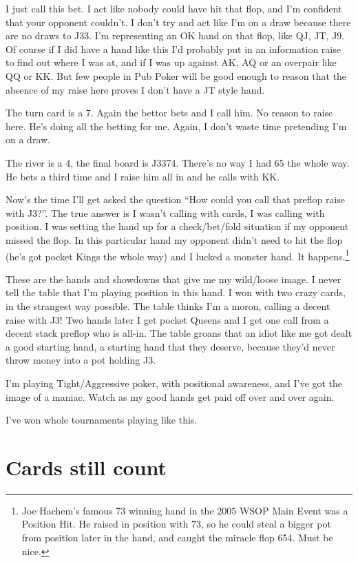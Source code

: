 I just call this bet. I act like nobody could have hit that flop, and
I'm confident that your opponent couldn't. I don't try and act like
I'm on a draw because there are no draws to J33. I'm representing an
OK hand on that flop, like QJ, JT, J9. Of course if I did have a hand
like this I'd probably put in an information raise to find out where
I was at, and if I was up against AK, AQ or an overpair like QQ or KK.
But few people in Pub Poker will be good enough to reason that the
absence of my raise here proves I don't have a JT style hand.

The turn card is a 7. Again the bettor bets and I call him.
No reason to raise here. He's doing all the betting for me. Again,
I don't waste time pretending I'm on a draw.

The river is a 4, the final board is J3374. There's no way I had 65
the whole way. He bets a third time and I raise him all in and he
calls with KK.

Now's the time I'll get asked the question ``How could you call that
preflop raise with J3?''. The true answer is I wasn't calling with
cards, I was calling with position. I was setting the hand up for
a check/bet/fold situation if my opponent missed the flop. In this
particular hand my opponent didn't need to hit the flop (he's got pocket
Kings the whole way) and I lucked a monster hand.
It happens.\footnote{Joe Hachem's famous 73 winning hand in the 2005
WSOP Main Event was a Position Hit. He raised in position with 73, so
he could steal a bigger pot from position later in the hand, and caught
the miracle flop 654. Must be nice.}

These are the hands and showdowns that give me my wild/loose image.
I never tell the table that I'm playing position in this hand.
I won with two crazy cards, in the strangest way possible. The table
thinks I'm a moron, calling a decent raise with J3! Two hands later I get
pocket Queens and I get one call from a decent stack preflop who is all-in.
The table groans that an idiot like me got dealt a good
starting hand, a starting hand that they deserve, because they'd never
throw money into a pot holding J3.

I'm playing Tight/Aggressive poker, with positional awareness,
and I've got the image of a maniac. Watch as my good hands get paid
off over and over again.

I've won whole tournaments playing like this.

\section{Cards still count}

